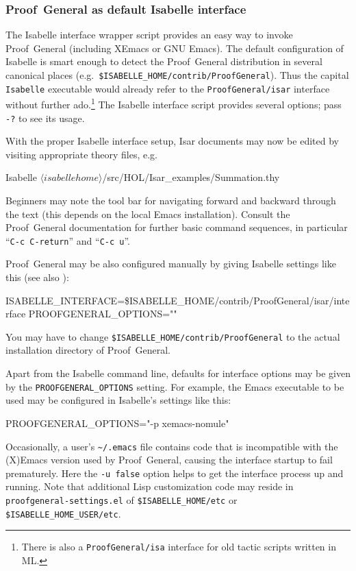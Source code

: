 \subsubsection{Proof~General as default Isabelle interface}

The Isabelle interface wrapper script provides an easy way to invoke
Proof~General (including XEmacs or GNU Emacs).  The default configuration of
Isabelle is smart enough to detect the Proof~General distribution in several
canonical places (e.g.\ \texttt{\$ISABELLE_HOME/contrib/ProofGeneral}).  Thus
the capital \texttt{Isabelle} executable would already refer to the
\texttt{ProofGeneral/isar} interface without further ado.\footnote{There is
  also a \texttt{ProofGeneral/isa} interface for old tactic scripts written in
  ML.} The Isabelle interface script provides several options; pass \verb,-?,
to see its usage.

With the proper Isabelle interface setup, Isar documents may now be edited by
visiting appropriate theory files, e.g.\ 
\begin{ttbox}
Isabelle \({\langle}isabellehome{\rangle}\)/src/HOL/Isar_examples/Summation.thy
\end{ttbox}
Beginners may note the tool bar for navigating forward and backward through
the text (this depends on the local Emacs installation).  Consult the
Proof~General documentation \cite{proofgeneral} for further basic command
sequences, in particular ``\texttt{C-c C-return}'' and ``\texttt{C-c u}''.

\medskip

Proof~General may be also configured manually by giving Isabelle settings like
this (see also \cite{isabelle-sys}):
\begin{ttbox}
ISABELLE_INTERFACE=\$ISABELLE_HOME/contrib/ProofGeneral/isar/interface
PROOFGENERAL_OPTIONS=""
\end{ttbox}
You may have to change \texttt{\$ISABELLE_HOME/contrib/ProofGeneral} to the
actual installation directory of Proof~General.

\medskip

Apart from the Isabelle command line, defaults for interface options may be
given by the \texttt{PROOFGENERAL_OPTIONS} setting.  For example, the Emacs
executable to be used may be configured in Isabelle's settings like this:
\begin{ttbox}
PROOFGENERAL_OPTIONS="-p xemacs-nomule"  
\end{ttbox}

Occasionally, a user's \verb,~/.emacs, file contains code that is incompatible
with the (X)Emacs version used by Proof~General, causing the interface startup
to fail prematurely.  Here the \texttt{-u false} option helps to get the
interface process up and running.  Note that additional Lisp customization
code may reside in \texttt{proofgeneral-settings.el} of
\texttt{\$ISABELLE_HOME/etc} or \texttt{\$ISABELLE_HOME_USER/etc}.


